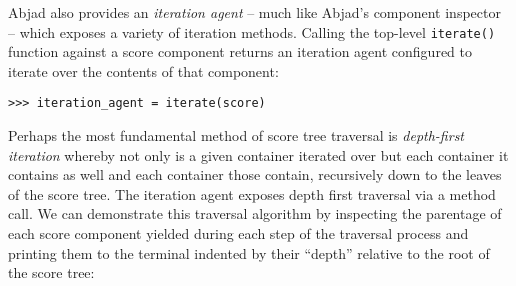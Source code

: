\noindent Abjad also provides an \emph{iteration agent} -- much like Abjad's
component inspector -- which exposes a variety of iteration methods. Calling
the top-level \texttt{iterate()} function against a score component returns an
iteration agent configured to iterate over the contents of that component:

\begin{comment}
<abjad>
iteration_agent = iterate(score)
</abjad>
\end{comment}

\begin{abjadbookoutput}
\begin{singlespacing}
\vspace{-0.5\baselineskip}
\begin{verbatim}
>>> iteration_agent = iterate(score)
\end{verbatim}
\end{singlespacing}
\end{abjadbookoutput}

\noindent Perhaps the most fundamental method of score tree traversal is
\emph{depth-first iteration}\cite{cormen2009introduction} whereby not only is a
given container iterated over but each container it contains as well and each
container those contain, recursively down to the leaves of the score tree. The
iteration agent exposes depth first traversal via a method call. We can
demonstrate this traversal algorithm by inspecting the parentage of each score
component yielded during each step of the traversal process and printing them
to the terminal indented by their \enquote{depth} relative to the root of the
score tree:

\begin{comment}
<abjad>
for component in iteration_agent.depth_first():
    parentage = inspect_(component).get_parentage()
    component_depth = parentage.depth
    indent = '    ' * component_depth
    string = '{}{}'.format(indent, repr(component))
    print(string)

</abjad>
\end{comment}

